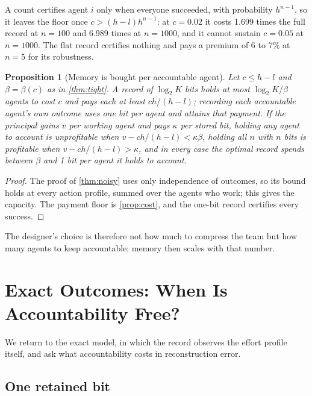 \documentclass[sigconf,anonymous,acmthm=false]{acmart}
\theoremstyle{acmplain}
\newtheorem{proposition}{Proposition}
\theoremstyle{acmdefinition}
\begin{document}
A count certifies agent $i$ only when everyone succeeded, with probability $h^{n-1}$, so it
leaves the floor once $c>(h-l)h^{n-1}$: at $c=0.02$ it costs 1.699 times the full record at
$n=100$ and 6.989 times at $n=1000$, and it cannot sustain $c=0.05$ at $n=1000$. The flat
record certifies nothing and pays a premium of 6 to 7\% at $n=5$ for its robustness.

\begin{proposition}[Memory is bought per accountable agent]\label{prop:designer}
Let $c\le h-l$ and $\beta=\beta(c)$ as in \cref{thm:tight}. A record of $\log_2K$
bits holds at most $\log_2K/\beta$ agents to cost $c$ and pays each at least $ch/(h-l)$;
recording each accountable agent's own outcome uses one bit per agent and attains that
payment. If the principal gains $v$ per working agent and pays $\kappa$ per stored bit,
holding any agent to account is unprofitable when $v-ch/(h-l)<\kappa\beta$, holding all $n$
with $n$ bits is profitable when $v-ch/(h-l)>\kappa$, and in every case the optimal record
spends between $\beta$ and 1 bit per agent it holds to account.
\end{proposition}
\begin{proof}
The proof of \cref{thm:noisy} uses only independence of outcomes, so its bound holds at every
action profile, summed over the agents who work; this gives the capacity. The payment floor
is \cref{prop:cost}, and the one-bit record certifies every success.
\end{proof}

The designer's choice is therefore not how much to compress the team but how many agents to
keep accountable; memory then scales with that number.

\section{Exact Outcomes: When Is Accountability Free?}\label{sec:exact}

We return to the exact model, in which the record observes the effort profile itself, and
ask what accountability costs in reconstruction error.

\subsection{One retained bit}\label{sec:onebit}
\end{document}
